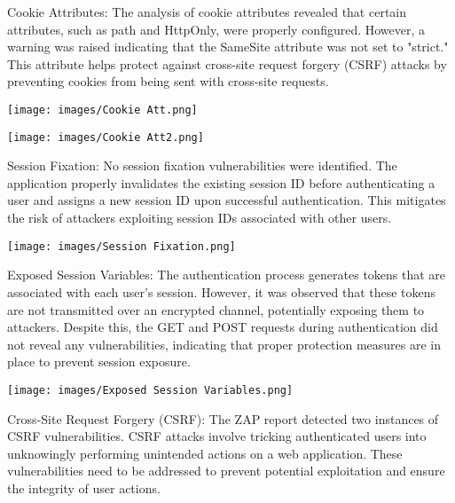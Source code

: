 \documentclass[12pt]{article}
\begin{document}
Cookie Attributes: The analysis of cookie attributes revealed that certain attributes, such as path and HttpOnly, were properly configured. However, a warning was raised indicating that the SameSite attribute was not set to "strict." This attribute helps protect against cross-site request forgery (CSRF) attacks by preventing cookies from being sent with cross-site requests.

\begin{center}
    \texttt{[image: images/Cookie Att.png]}
\end{center}

\begin{center}
    \texttt{[image: images/Cookie Att2.png]}
\end{center}

Session Fixation: No session fixation vulnerabilities were identified. The application properly invalidates the existing session ID before authenticating a user and assigns a new session ID upon successful authentication. This mitigates the risk of attackers exploiting session IDs associated with other users.

\begin{center}
    \texttt{[image: images/Session Fixation.png]}
\end{center}

\newpage

Exposed Session Variables: The authentication process generates tokens that are associated with each user's session. However, it was observed that these tokens are not transmitted over an encrypted channel, potentially exposing them to attackers. Despite this, the GET and POST requests during authentication did not reveal any vulnerabilities, indicating that proper protection measures are in place to prevent session exposure.

\begin{center}
    \texttt{[image: images/Exposed Session Variables.png]}
\end{center}

\newpage

Cross-Site Request Forgery (CSRF): The ZAP report detected two instances of CSRF vulnerabilities. CSRF attacks involve tricking authenticated users into unknowingly performing unintended actions on a web application. These vulnerabilities need to be addressed to prevent potential exploitation and ensure the integrity of user actions.
\end{document}
